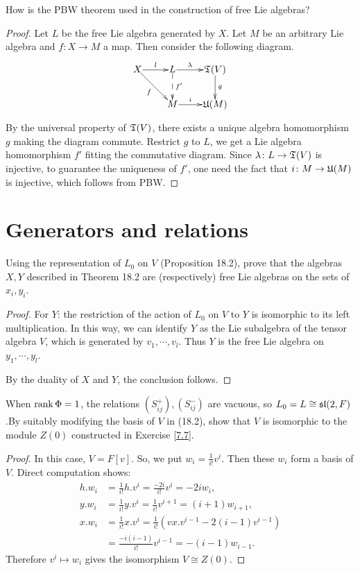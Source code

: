 \begin{ex}
	How is the PBW theorem used in the construction of free Lie algebras?
\end{ex}
\begin{proof}
	Let $L$ be the free Lie algebra generated by $X$. Let $M$ be an arbitrary Lie algebra and $f\colon X\to M$ a map. Then consider the following diagram.
	\[
	\xymatrix@1{
		X\ar[r]^-{l}\ar[dr]_-{f} & L\ar[r]^-{\lambda}\ar@{-->}[d]^-{f'} & \TTt(V)\ar[d]^-{g} \\
		& M\ar[r]^-{i} & \UUu(M)
		}
	\]
	
	By the universal property of $\TTt(V)$, there exists a unique algebra homomorphism $g$ making the diagram commute. Restrict $g$ to $L$, we get a Lie algebra homomorphism $f'$ fitting the commutative diagram. Since $\lambda\colon L\to \TTt(V)$ is injective, to guarantee the uniqueness of $f'$, one need the fact that $i\colon M\to \UUu(M)$ is injective, which follows from PBW.
\end{proof}

\section{Generators and relations}

\begin{ex}
	Using the representation of $L_0$ on $V$ (Proposition 18.2), prove that the algebras $X, Y$ described in Theorem 18.2 are (respectively) free Lie algebras on the sets of $x_i, y_i$.
\end{ex}
\begin{proof}
	For $Y$: the restriction of the action of $L_0$ on $V$ to $Y$ is isomorphic to its left multiplication. In this way, we can identify $Y$ as the Lie subalgebra of the tensor algebra $V$, which is generated by $v_1,\cdots,v_l$. Thus $Y$ is the free Lie algebra on $y_1,\cdots,y_l$.
	
	By the duality of $X$ and $Y$, the conclusion follows.
\end{proof}

\begin{ex}
	When $\rank \Phi = 1$, the relations $(S_{ij}^+), (S_{ij}^−)$ are vacuous, so $L_0 = L \cong \sl(2,F)$.By suitably modifying the basis of $V$ in (18.2), show that $V$ is isomorphic to the module $Z(0)$ constructed in Exercise \ref{7.7}.
\end{ex}
\begin{proof}
	In this case, $V=F[v]$. So, we put $w_i = \frac{1}{i!}v^i$. Then these $w_i$ form a basis of $V$. Direct computation shows:
	\begin{align*}
		h.w_i & = \frac{1}{i!}h.v^i = \frac{-2i}{i!}v^i = -2iw_i, \\
		y.w_i & = \frac{1}{i!}y.v^i = \frac{1}{i!}v^{i+1} = (i+1)w_{i+1}, \\
		x.w_i & = \frac{1}{i!}x.v^i = \frac{1}{i!}(vx.v^{i-1}-2(i-1)v^{i-1}) \\
		& = \frac{-i(i-1)}{i!}v^{i-1} = -(i-1)w_{i-1}.
	\end{align*}
	Therefore $v^i\mapsto w_i$ gives the isomorphism $V\cong Z(0)$.
\end{proof}

